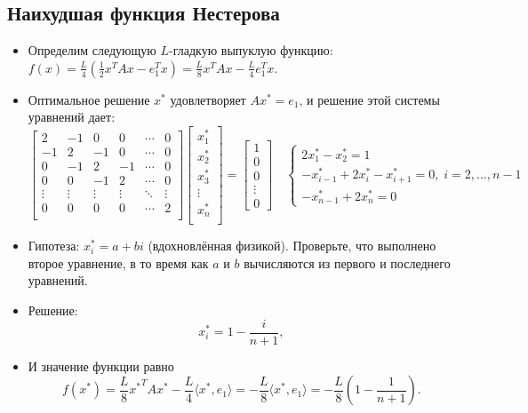 \documentclass[
  russian,
  letterpaper,
  DIV=11,
  numbers=noendperiod]{scrartcl}
\begin{document}
\subsection{Наихудшая функция
Нестерова}\label{ux43dux430ux438ux445ux443ux434ux448ux430ux44f-ux444ux443ux43dux43aux446ux438ux44f-ux43dux435ux441ux442ux435ux440ux43eux432ux430-1}

\begin{itemize}
\item
  Определим следующую \(L\)-гладкую выпуклую функцию:
  \(f(x) = \frac{L}{4}\left(\frac{1}{2} x^T A x - e_1^T x \right) = \frac{L}{8} x^T A x - \frac{L}{4} e_1^T x.\)
\item
  Оптимальное решение \(x^*\) удовлетворяет \(Ax^* = e_1\), и решение
  этой системы уравнений дает: \[
    \begin{bmatrix}
        2 & -1 & 0 & 0 & \cdots & 0 \\
        -1 & 2 & -1 & 0 & \cdots & 0 \\
        0 & -1 & 2 & -1  & \cdots & 0 \\
        0 & 0 & -1 & 2  & \cdots & 0 \\
        \vdots & \vdots & \vdots & \vdots & \ddots & \vdots \\
        0 & 0 & 0 & 0 & \cdots & 2  \\
    \end{bmatrix} \begin{bmatrix}
        x_1^* \\
        x_2^* \\
        x_3^* \\
        \vdots \\
        x_{n}^* \\
    \end{bmatrix} = \begin{bmatrix} 1 \\ 0 \\ 0 \\ \vdots \\ 0 \end{bmatrix} \quad \begin{cases} 2x_1^* - x_2^* = 1 \\ -x_{i-1}^* + 2x_{i}^* - x_{i+1}^* = 0, \; i = 2, \ldots, n-1 \\ -x_{n-1}^* + 2x_n^* = 0 \end{cases}
    \]
\item
  Гипотеза: \(x_i^* = a+bi\) (вдохновлённая физикой). Проверьте, что
  выполнено второе уравнение, в то время как \(a\) и \(b\) вычисляются
  из первого и последнего уравнений.
\item
  Решение: \[
    x^*_i = 1 - \frac{i}{n+1},
    \]
\item
  И значение функции равно \[
    f(x^*) =  \frac{L}{8} {x^*}^T A x^* - \frac{L}{4}\langle x^*, e_1 \rangle = -\frac{L}{8} \langle x^*, e_1 \rangle = -\frac{L}{8} \left(1 - \frac{1}{n+1}\right).
    \]
\end{itemize}
\end{document}

